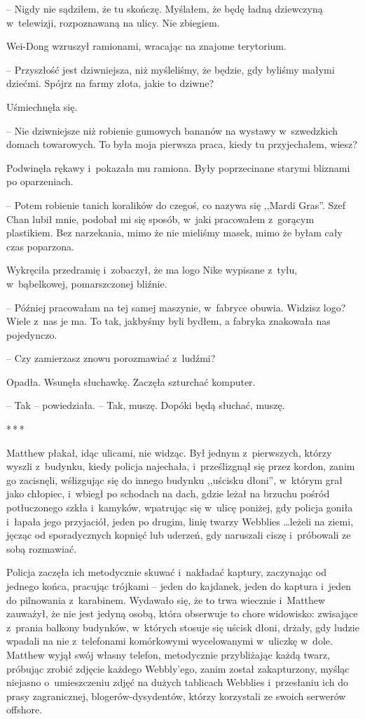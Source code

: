 \documentclass[oneside,polish,11pt,rmheadings]{mwbk}
\newcommand{\threeast}{\par\centerline{*\,*\,*}\medskip\par}
\begin{document}
-- Nigdy nie sądziłem, że tu skończę. Myślałem, że będę ładną dziewczyną w~telewizji, rozpoznawaną na ulicy. Nie zbiegiem.

Wei-Dong wzruszył ramionami, wracając na znajome terytorium. 

-- Przyszłość jest dziwniejsza, niż myśleliśmy, że będzie, gdy byliśmy małymi dziećmi. Spójrz na farmy złota, jakie to dziwne?

Uśmiechnęła się. 

-- Nie dziwniejsze niż robienie gumowych bananów na wystawy w~szwedzkich domach towarowych. To była moja pierwsza praca, kiedy tu przyjechałem, wiesz? 

Podwinęła rękawy i~pokazała mu ramiona. Były poprzecinane starymi bliznami po oparzeniach. 

-- Potem robienie tanich koralików do czegoś, co nazywa się ,,Mardi Gras''. Szef Chan lubił mnie, podobał mi się sposób, w~jaki pracowałem z~gorącym plastikiem. Bez narzekania, mimo że nie mieliśmy masek, mimo że byłam cały czas poparzona. 

Wykręciła przedramię i~zobaczył, że ma logo Nike wypisane z~tyłu, w~bąbelkowej, pomarszczonej bliźnie. 

-- Później pracowałam na tej samej maszynie, w~fabryce obuwia. Widzisz logo? Wiele z~nas je ma. To tak, jakbyśmy byli bydłem, a fabryka znakowała nas pojedynczo.

-- Czy zamierzasz znowu porozmawiać z~ludźmi?

Opadła. Wsunęła słuchawkę. Zaczęła szturchać komputer. 

-- Tak -- powiedziała. -- Tak, muszę. Dopóki będą słuchać, muszę.

\bigskip
\threeast

Matthew płakał, idąc ulicami, nie widząc. Był jednym z~pierwszych, którzy wyszli z~budynku, kiedy policja najechała, i~prześlizgnął się przez kordon, zanim go zacisnęli, wślizgując się do innego budynku ,,uścisku dłoni'', w~którym grał jako chłopiec, i~wbiegł po schodach na dach, gdzie leżał na brzuchu pośród potłuczonego szkła i~kamyków, wpatrując się w~ulicę poniżej, gdy policja goniła i~łapała jego przyjaciół, jeden po drugim, linię twarzy Webblies \ldots  leżeli na ziemi, jęcząc od sporadycznych kopnięć lub uderzeń, gdy naruszali ciszę i~próbowali ze sobą rozmawiać.

Policja zaczęła ich metodycznie skuwać i~nakładać kaptury, zaczynając od jednego końca, pracując trójkami -- jeden do kajdanek, jeden do kaptura i~jeden do pilnowania z~karabinem. Wydawało się, że to trwa wiecznie i~Matthew zauważył, że nie jest jedyną osobą, która obserwuje to chore widowisko: zwisające z~prania balkony budynków, w~których stosuje się uścisk dłoni, drżały, gdy ludzie wpadali na nie z~telefonami komórkowymi wycelowanymi w~uliczkę w~dole. Matthew wyjął swój własny telefon, metodycznie przybliżając każdą twarz, próbując zrobić zdjęcie każdego Webbly'ego, zanim został zakapturzony, myśląc niejasno o~umieszczeniu zdjęć na dużych tablicach Webblies i~przesłaniu ich do prasy zagranicznej, blogerów-dysydentów, którzy korzystali ze swoich serwerów offshore.
\end{document}
